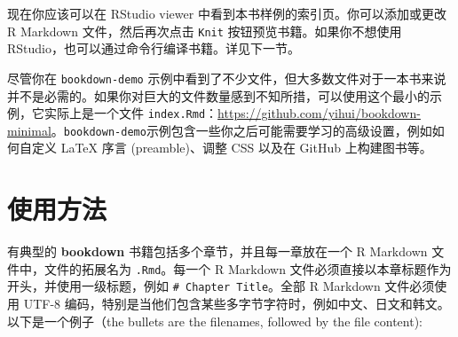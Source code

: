 \documentclass[
  12pt,
]{krantz}
\theoremstyle{definition}
\theoremstyle{definition}
\theoremstyle{definition}
\theoremstyle{definition}
\theoremstyle{remark}
\begin{document}
现在你应该可以在 RStudio viewer 中看到本书样例的索引页。你可以添加或更改 R Markdown 文件，然后再次点击 \texttt{Knit} 按钮预览书籍。如果你不想使用 RStudio，也可以通过命令行编译书籍。详见下一节。

尽管你在 \texttt{bookdown-demo} 示例中看到了不少文件，但大多数文件对于一本书来说并不是必需的。如果你对巨大的文件数量感到不知所措，可以使用这个最小的示例，它实际上是一个文件 \texttt{index.Rmd}：\url{https://github.com/yihui/bookdown-minimal}。\texttt{bookdown-demo}示例包含一些你之后可能需要学习的高级设置，例如如何自定义 LaTeX 序言 (preamble)、调整 CSS 以及在 GitHub 上构建图书等。

\hypertarget{usage}{%
\section{使用方法}\label{usage}}

有典型的 \textbf{bookdown} 书籍包括多个章节，并且每一章放在一个 R Markdown 文件中，文件的拓展名为 \texttt{.Rmd}。每一个 R Markdown 文件必须直接以本章标题作为开头，并使用一级标题，例如 \texttt{\#\ Chapter\ Title}。全部 R Markdown 文件必须使用 UTF-8 编码，特别是当他们包含某些多字节字符时，例如中文、日文和韩文。以下是一个例子（the bullets are the filenames, followed by the file content):
\end{document}
